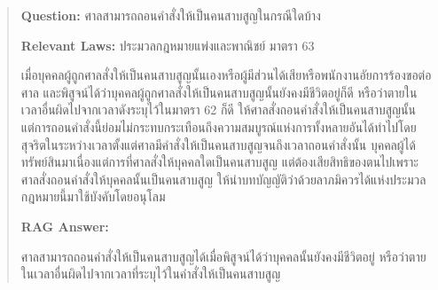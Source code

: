 \begin{quote}
    \begin{thai}
    \textbf{Question: } ศาลสามารถถอนคำสั่งให้เป็นคนสาบสูญในกรณีใดบ้าง
    
    \textbf{Relevant Laws: }
    ประมวลกฎหมายแพ่งและพาณิชย์ มาตรา 63

    เมื่อบุคคลผู้ถูกศาลสั่งให้เป็นคนสาบสูญนั้นเองหรือผู้มีส่วนได้เสียหรือพนักงานอัยการร้องขอต่อศาล และพิสูจน์ได้ว่าบุคคลผู้ถูกศาลสั่งให้เป็นคนสาบสูญนั้นยังคงมีชีวิตอยู่ก็ดี หรือว่าตายในเวลาอื่นผิดไปจากเวลาดังระบุไว้ในมาตรา 62 ก็ดี ให้ศาลสั่งถอนคำสั่งให้เป็นคนสาบสูญนั้น แต่การถอนคำสั่งนี้ย่อมไม่กระทบกระเทือนถึงความสมบูรณ์แห่งการทั้งหลายอันได้ทำไปโดยสุจริตในระหว่างเวลาตั้งแต่ศาลมีคำสั่งให้เป็นคนสาบสูญจนถึงเวลาถอนคำสั่งนั้น
    บุคคลผู้ได้ทรัพย์สินมาเนื่องแต่การที่ศาลสั่งให้บุคคลใดเป็นคนสาบสูญ แต่ต้องเสียสิทธิของตนไปเพราะศาลสั่งถอนคำสั่งให้บุคคลนั้นเป็นคนสาบสูญ ให้นำบทบัญญัติว่าด้วยลาภมิควรได้แห่งประมวลกฎหมายนี้มาใช้บังคับโดยอนุโลม 

    \textbf{RAG Answer: }

    ศาลสามารถถอนคำสั่งให้เป็นคนสาบสูญได้เมื่อพิสูจน์ได้ว่าบุคคลนั้นยังคงมีชีวิตอยู่ หรือว่าตายในเวลาอื่นผิดไปจากเวลาที่ระบุไว้ในคำสั่งให้เป็นคนสาบสูญ 
    \end{thai}
\end{quote}



